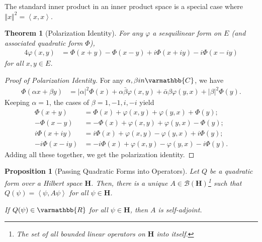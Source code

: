 \documentclass[12pt]{extarticle}
\newcommand{\R}{\varmathbb{R}}
\newcommand{\C}{\varmathbb{C}}
\newcommand{\iprod}[2]{\left\langle #1,#2\right\rangle}
\newcommand{\norm}[1]{\left\Vert #1\right\Vert}
\theoremstyle{plain}
\newtheorem*{theorem}{Theorem}%
\newtheorem*{proposition}{Proposition}%
\theoremstyle{definition}
\theoremstyle{remark}
\renewcommand{\newline}{\hfill\break}
\begin{document}
  The standard inner product in an inner product space is a special case where $\norm{x}^2 = \iprod{x}{x}$.
  \begin{theorem}[Polarization Identity]
    For any $\varphi$ a sesquilinear form on $E$ (and associated quadratic form $\Phi$),
    \begin{align*}
      4\varphi(x,y) &= \Phi(x+y) - \Phi(x-y) + i\Phi(x + iy) - i\Phi(x - iy)
    \end{align*}
    for all $x,y\in E$.
  \end{theorem}
  \begin{proof}[Proof of Polarization Identity]
    For any $\alpha,\beta in \C$, we have
    \begin{align*}
      \Phi(\alpha x + \beta y) &= \left\vert \alpha \right\vert^2\Phi(x) + \alpha\bar{\beta}\varphi(x,y) + \bar{\alpha}\beta \varphi(y,x) + \left\vert \beta \right\vert^2\Phi(y).
    \end{align*}
    Keeping $\alpha = 1$, the cases of $\beta = 1,-1,i,-i$ yield
    \begin{align*}
      \Phi(x+y) &= \Phi(x) + \varphi(x,y) + \varphi(y,x) + \Phi(y);\\
      -\Phi(x-y) &= -\Phi(x) + \varphi(x,y) + \varphi(y,x) - \Phi(y);\\
      i\Phi(x+iy) &= i\Phi(x) + \varphi(x,y) - \varphi(y,x) + i\Phi(y);\\
      -i\Phi(x-iy) &= -i\Phi(x) + \varphi(x,y) - \varphi(y,x) - i\Phi(y).
    \end{align*}
    Adding all these together, we get the polarization identity.
  \end{proof}
  \begin{proposition}[Passing Quadratic Forms into Operators]
    Let $Q$ be a quadratic form over a Hilbert space $\mathbf{H}$. Then, there is a unique $A\in \mathcal{B}\left(\mathbf{H}\right)$\footnote{The set of all bounded linear operators on $\mathbf{H}$ into itself.} such that $Q(\psi) = \iprod{\psi}{A\psi}$ for all $\psi \in \mathbf{H}$.\newline

    If $Q(\psi) \in \R$ for all $\psi \in \mathbf{H}$, then $A$ is self-adjoint.
  \end{proposition}
\end{document}
